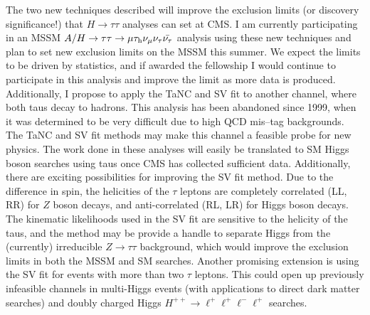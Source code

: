 \documentclass[a4paper,10pt,oneside]{article}
\begin{document}
The two new techniques described will improve the exclusion limits (or discovery
significance!) that $H\rightarrow\tau\tau$ analyses can set at CMS.  I am
currently participating in an MSSM $A/H \rightarrow \tau\tau \rightarrow \mu
\tau_{\rm h} \nu_\mu \nu_\tau \bar {\nu_\tau}$ analysis using these new
techniques and plan
to set new exclusion limits on the MSSM this summer.  We expect the limits to be
driven by statistics, and if awarded the fellowship I would continue to
participate in this analysis and improve the limit as more data is produced.
Additionally, I propose to apply the TaNC and SV fit to another channel, where
both taus decay to hadrons.  This analysis has been abandoned since 1999, when
it was determined to be very difficult due to high QCD mis--tag backgrounds.
The TaNC and SV fit methods may make this channel a feasible probe for new
physics.  The work done in these analyses will easily be translated to SM Higgs
boson searches using taus once CMS has collected sufficient data.  Additionally,
there are exciting possibilities for improving the SV fit method.  Due to the
difference in spin, the helicities of the $\tau$ leptons are completely
correlated (LL, RR) for $Z$ boson decays, and anti-correlated (RL, LR) for Higgs
boson decays. The kinematic likelihoods used in the SV fit are sensitive to the
helicity of the taus, and the method may be provide a handle to separate Higgs
from the (currently) irreducible $Z\rightarrow\tau\tau$ background, which would
improve the exclusion limits in both the MSSM and SM searches.  Another
promising extension is using the SV fit for events with more than two $\tau$
leptons.  This could open up previously infeasible channels in multi-Higgs
events (with applications to direct dark matter searches) and doubly charged
Higgs $H^{++} \rightarrow \ell^+ \ell^+ \ell^- \ell^+$ searches.  
\end{document}
